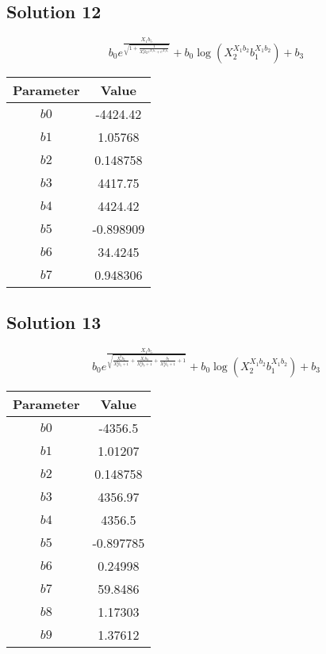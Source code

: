 \documentclass{article}
\begin{document}
\subsection*{Solution 12}
\[
b_{0} e^{\frac{X_{1} b_{5}}{\sqrt{1 + \frac{1}{X_{2}^{2} b_{6} e^{X_{1} b_{7}} + e^{X_{1} b_{7}}}}}} + b_{0} \log{\left(X_{2}^{X_{1} b_{2}} b_{1}^{X_{1} b_{2}} \right)} + b_{3}
\]
\begin{center}
\begin{tabular}{cc}
\toprule
Parameter & Value \\
\midrule
$b0$ & -4424.42 \\
$b1$ & 1.05768 \\
$b2$ & 0.148758 \\
$b3$ & 4417.75 \\
$b4$ & 4424.42 \\
$b5$ & -0.898909 \\
$b6$ & 34.4245 \\
$b7$ & 0.948306 \\
\bottomrule
\end{tabular}
\end{center}

\vspace{1em}
\subsection*{Solution 13}
\[
b_{0} e^{\frac{X_{1} b_{5}}{\sqrt{\frac{X_{1}^{2} b_{6}}{X_{2}^{2} b_{7} + 1} + \frac{X_{1} b_{8}}{X_{2}^{2} b_{7} + 1} + \frac{b_{9}}{X_{2}^{2} b_{7} + 1} + 1}}} + b_{0} \log{\left(X_{2}^{X_{1} b_{2}} b_{1}^{X_{1} b_{2}} \right)} + b_{3}
\]
\begin{center}
\begin{tabular}{cc}
\toprule
Parameter & Value \\
\midrule
$b0$ & -4356.5 \\
$b1$ & 1.01207 \\
$b2$ & 0.148758 \\
$b3$ & 4356.97 \\
$b4$ & 4356.5 \\
$b5$ & -0.897785 \\
$b6$ & 0.24998 \\
$b7$ & 59.8486 \\
$b8$ & 1.17303 \\
$b9$ & 1.37612 \\
\bottomrule
\end{tabular}
\end{center}
\end{document}

